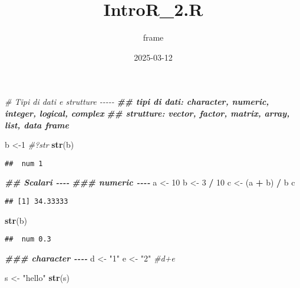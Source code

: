 \documentclass[
]{article}
\title{IntroR\_2.R}
\author{frame}
\date{2025-03-12}
\newenvironment{Shaded}{\begin{snugshade}}{\end{snugshade}}
\newcommand{\CommentTok}[1]{\textcolor[rgb]{0.56,0.35,0.01}{\textit{#1}}}
\newcommand{\DecValTok}[1]{\textcolor[rgb]{0.00,0.00,0.81}{#1}}
\newcommand{\DocumentationTok}[1]{\textcolor[rgb]{0.56,0.35,0.01}{\textbf{\textit{#1}}}}
\newcommand{\FunctionTok}[1]{\textcolor[rgb]{0.13,0.29,0.53}{\textbf{#1}}}
\newcommand{\NormalTok}[1]{#1}
\newcommand{\OtherTok}[1]{\textcolor[rgb]{0.56,0.35,0.01}{#1}}
\newcommand{\SpecialCharTok}[1]{\textcolor[rgb]{0.81,0.36,0.00}{\textbf{#1}}}
\newcommand{\StringTok}[1]{\textcolor[rgb]{0.31,0.60,0.02}{#1}}
\begin{document}
\maketitle

\begin{Shaded}
\begin{Highlighting}[]
\CommentTok{\# Tipi di dati e strutture {-}{-}{-}{-}{-}}
\DocumentationTok{\#\# tipi di dati: character, numeric, integer, logical, complex}
\DocumentationTok{\#\# strutture: vector, factor, matrix, array, list, data frame}

\NormalTok{b }\OtherTok{\textless{}{-}}\DecValTok{1}
\CommentTok{\#?str}
\FunctionTok{str}\NormalTok{(b)}
\end{Highlighting}
\end{Shaded}

\begin{verbatim}
##  num 1
\end{verbatim}

\begin{Shaded}
\begin{Highlighting}[]
\DocumentationTok{\#\# Scalari {-}{-}{-}{-}}
\DocumentationTok{\#\#\# numeric {-}{-}{-}{-}}
\NormalTok{a }\OtherTok{\textless{}{-}} \DecValTok{10}
\NormalTok{b }\OtherTok{\textless{}{-}} \DecValTok{3} \SpecialCharTok{/} \DecValTok{10}
\NormalTok{c }\OtherTok{\textless{}{-}}\NormalTok{ (a }\SpecialCharTok{+}\NormalTok{ b) }\SpecialCharTok{/}\NormalTok{ b}
\NormalTok{c}
\end{Highlighting}
\end{Shaded}

\begin{verbatim}
## [1] 34.33333
\end{verbatim}

\begin{Shaded}
\begin{Highlighting}[]
\FunctionTok{str}\NormalTok{(b)}
\end{Highlighting}
\end{Shaded}

\begin{verbatim}
##  num 0.3
\end{verbatim}

\begin{Shaded}
\begin{Highlighting}[]
\DocumentationTok{\#\#\# character {-}{-}{-}{-}}
\NormalTok{d }\OtherTok{\textless{}{-}} \StringTok{"1"}
\NormalTok{e }\OtherTok{\textless{}{-}} \StringTok{"2"}
\CommentTok{\#d+e }

\NormalTok{s }\OtherTok{\textless{}{-}} \StringTok{"hello"}
\FunctionTok{str}\NormalTok{(s)}
\end{Highlighting}
\end{Shaded}
\end{document}
